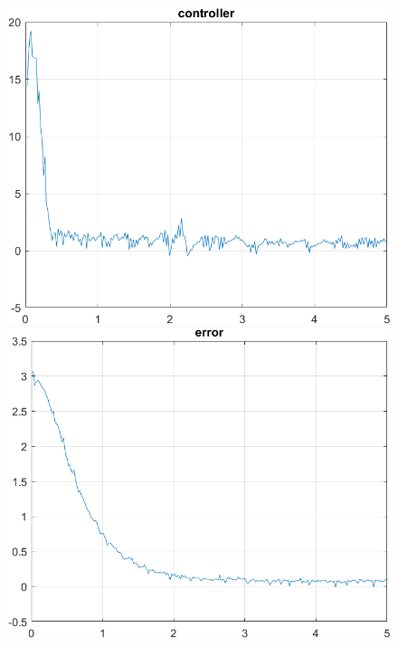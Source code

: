 \begin{figure}[H]
    \vspace{0.5cm}
    
    \begin{minipage}{0.45\textwidth}
        \includegraphics[width=\linewidth]{Images/lab2/3/con223.png}
    \end{minipage}
    \hfill
    \begin{minipage}{0.45\textwidth}
        \includegraphics[width=\linewidth]{Images/lab2/3/err223.png}
    \end{minipage}
\end{figure}
\newpage
